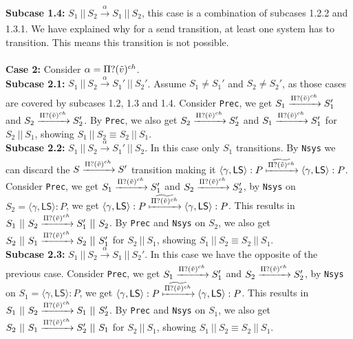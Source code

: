\indent \textbf{Subcase 1.4:} $S_1 \ || \ S_2 \xrightarrow[]{\alpha} S_1 \ || \ S_2$, this case is a combination of subcases 1.2.2 and 1.3.1. We have explained why for a send transition, at least one system has to transition. This means this transition is not possible.\\
\\
\textbf{Case 2: } Consider $\alpha = \Pi ? (\Tilde{v})^{ch}$.\\
\indent \textbf{Subcase 2.1: }$S_1 \ || \ S_2 \xrightarrow[]{\alpha} S_1' \ || \ S_2'$. Assume $S_1\not= S_1'$ and $S_2\not= S_2'$, as those cases are covered by subcases 1.2, 1.3 and 1.4. Consider \texttt{Prec}, we get $S_1 \xrightarrow[]{\Pi ? (\Tilde{v})^{ch}} S_1' $ and $ S_2 \xrightarrow[]{\Pi ? (\Tilde{v})^{ch}} S_2'$. By \texttt{Prec}, we also get $ S_2 \xrightarrow[]{\Pi ? (\Tilde{v})^{ch}} S_2'$ and $S_1 \xrightarrow[]{\Pi ? (\Tilde{v})^{ch}} S_1' $ for $S_2\ ||\ S_1$, showing $S_1 \ || \ S_2 \equiv S_2\ ||\ S_1$.\\
\indent \textbf{Subcase 2.2: }$S_1 \ || \ S_2 \xrightarrow[]{\alpha} S_1' \ || \ S_2$. In this case only $S_1$ transitions. By \texttt{Nsys} we can discard the $S \xrightarrow[]{\Pi ? (\Tilde{v})^{ch}} S'$ transition making it $\langle \gamma , \mathsf{LS} \rangle : P \xmapsto[]{\widetilde{\Pi ? (\Tilde{v})^{ch}}} \langle \gamma , \mathsf{LS} \rangle : P$. Consider \texttt{Prec}, we get $S_1 \xrightarrow[]{\Pi ? (\Tilde{v})^{ch}} S_1' $ and $ S_2 \xrightarrow[]{\Pi ? (\Tilde{v})^{ch}} S_2'$, by \texttt{Nsys} on $S_2=\langle \gamma , \mathsf{LS} \rangle : P$, we get $\langle \gamma , \mathsf{LS} \rangle : P  \xmapsto[]{\widetilde{\Pi ? (\Tilde{v})^{ch}}} \langle \gamma , \mathsf{LS} \rangle : P$. This results in $S_1 \ || \ S_2 \xrightarrow[]{\Pi ? (\Tilde{v})^{ch}} S_1' \ || \ S_2$. By \texttt{Prec} and \texttt{Nsys} on $S_2$, we also get $S_2 \ || \ S_1 \xrightarrow[]{\Pi ? (\Tilde{v})^{ch}} S_2 \ || \ S_1'$ for $S_2\ ||\ S_1$, showing $S_1 \ || \ S_2 \equiv S_2\ ||\ S_1$.\\ 
\indent \textbf{Subcase 2.3: }$S_1 \ || \ S_2 \xrightarrow[]{\alpha} S_1 \ || \ S_2'$. In this case we have the opposite of the previous case. Consider \texttt{Prec}, we get $S_1 \xrightarrow[]{\Pi ? (\Tilde{v})^{ch}} S_1' $ and $ S_2 \xrightarrow[]{\Pi ? (\Tilde{v})^{ch}} S_2'$, by \texttt{Nsys} on $S_1=\langle \gamma , \mathsf{LS} \rangle : P$, we get $\langle \gamma , \mathsf{LS} \rangle : P  \xmapsto[]{\widetilde{\Pi ? (\Tilde{v})^{ch}}} \langle \gamma , \mathsf{LS} \rangle : P$. This results in $S_1 \ || \ S_2 \xrightarrow[]{\Pi ? (\Tilde{v})^{ch}} S_1 \ || \ S_2'$. By \texttt{Prec} and \texttt{Nsys} on $S_1$, we also get $S_2 \ || \ S_1 \xrightarrow[]{\Pi ? (\Tilde{v})^{ch}} S_2' \ || \ S_1$ for $S_2\ ||\ S_1$, showing $S_1 \ || \ S_2 \equiv S_2\ ||\ S_1$.\\
